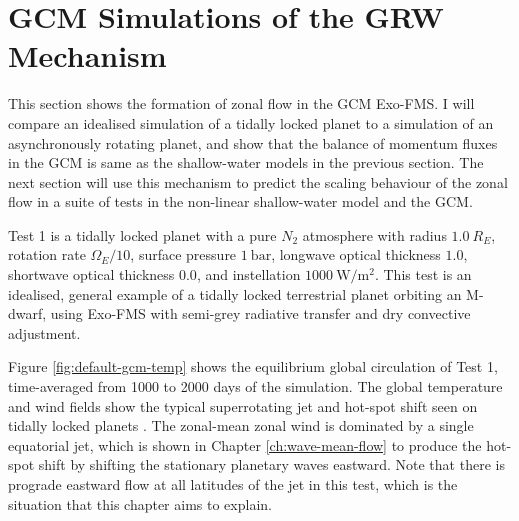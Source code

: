 


\section{GCM Simulations of the GRW Mechanism}\label{sec:gcm-sim-grw}

This section shows the formation of zonal flow in the GCM Exo-FMS. I will compare an idealised simulation of a tidally locked planet to a simulation of an asynchronously rotating planet, and show that the balance of momentum fluxes in the GCM is same as the shallow-water models in the previous section. The next section will use this mechanism to predict the scaling behaviour of the zonal flow in a suite of tests in the non-linear shallow-water model and the GCM.

Test 1 is a tidally locked planet with a pure $N_{2}$ atmosphere with radius  $1.0\ R_{E}$, rotation rate $\Omega_{E}/10$, surface pressure $\SI{1}{\bar}$, longwave optical thickness $1.0$, shortwave optical thickness $0.0$, and instellation $\SI{1000}{\watt\per\metre\squared}$. This test is an idealised, general example of a tidally locked terrestrial planet orbiting an M-dwarf, using Exo-FMS with semi-grey radiative transfer and dry convective adjustment.

Figure \ref{fig:default-gcm-temp} shows the equilibrium global circulation of Test 1, time-averaged from 1000 to 2000 days of the simulation. The global temperature and wind fields show the typical superrotating jet and hot-spot shift seen on tidally locked planets \citep{showman2012review, pierrehumbert2018review}. The zonal-mean zonal wind is dominated by a single equatorial jet, which is shown in Chapter \ref{ch:wave-mean-flow} to produce the hot-spot shift by shifting the stationary planetary waves eastward. Note that there is prograde eastward flow at all latitudes of the jet in this test, which is the situation that this chapter aims to explain.

